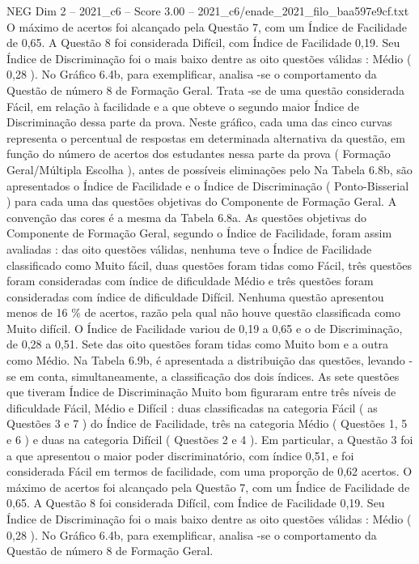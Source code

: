\begin{textsample}{NEG Dim 2 – 2021\_c6 – Score 3.00 – 2021\_c6/enade\_2021\_filo\_baa597e9cf.txt}
O máximo de acertos foi alcançado pela Questão 7, com um Índice de Facilidade de 0,65.
A Questão 8 foi considerada Difícil, com Índice de Facilidade 0,19.
Seu Índice de Discriminação foi o mais baixo dentre as oito questões válidas : Médio ( 0,28 ).
No Gráfico 6.4b, para exemplificar, analisa -se o comportamento da Questão de número 8 de Formação Geral.
Trata -se de uma questão considerada Fácil, em relação à facilidade e a que obteve o segundo maior Índice de Discriminação dessa parte da prova.
Neste gráfico, cada uma das cinco curvas representa o percentual de respostas em determinada alternativa da questão, em função do número de acertos dos estudantes nessa parte da prova ( Formação Geral/Múltipla Escolha ), antes de possíveis eliminações pelo Na Tabela 6.8b, são apresentados o Índice de Facilidade e o Índice de Discriminação ( Ponto-Bisserial ) para cada uma das questões objetivas do Componente de Formação Geral.
A convenção das cores é a mesma da Tabela 6.8a.
As questões objetivas do Componente de Formação Geral, segundo o Índice de Facilidade, foram assim avaliadas : das oito questões válidas, nenhuma teve o Índice de Facilidade classificado como Muito fácil, duas questões foram tidas como Fácil, três questões foram consideradas com índice de dificuldade Médio e três questões foram consideradas com índice de dificuldade Difícil.
Nenhuma questão apresentou menos de 16 \% de acertos, razão pela qual não houve questão classificada como Muito difícil.
O Índice de Facilidade variou de 0,19 a 0,65 e o de Discriminação, de 0,28 a 0,51.
Sete das oito questões foram tidas como Muito bom e a outra como Médio.
Na Tabela 6.9b, é apresentada a distribuição das questões, levando -se em conta, simultaneamente, a classificação dos dois índices.
As sete questões que tiveram Índice de Discriminação Muito bom figuraram entre três níveis de dificuldade Fácil, Médio e Difícil : duas classificadas na categoria Fácil ( as Questões 3 e 7 ) do Índice de Facilidade, três na categoria Médio ( Questões 1, 5 e 6 ) e duas na categoria Difícil ( Questões 2 e 4 ).
Em particular, a Questão 3 foi a que apresentou o maior poder discriminatório, com índice 0,51, e foi considerada Fácil em termos de facilidade, com uma proporção de 0,62 acertos.
O máximo de acertos foi alcançado pela Questão 7, com um Índice de Facilidade de 0,65.
A Questão 8 foi considerada Difícil, com Índice de Facilidade 0,19.
Seu Índice de Discriminação foi o mais baixo dentre as oito questões válidas : Médio ( 0,28 ).
No Gráfico 6.4b, para exemplificar, analisa -se o comportamento da Questão de número 8 de Formação Geral.

\end{textsample}

